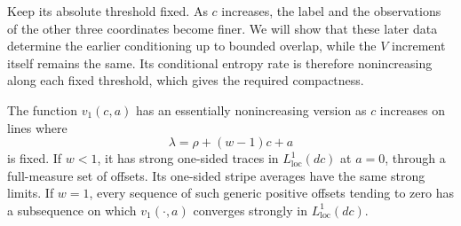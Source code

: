 Keep its absolute threshold fixed.  As $c$ increases, the label and
the observations of the other three coordinates become finer.  We will
show that these later data determine the earlier conditioning up to
bounded overlap, while the $V$ increment itself remains the same.  Its
conditional entropy rate is therefore nonincreasing along each fixed
threshold, which gives the required compactness.

\begin{lemma}
\label{lem:velocity-trace}
The function $v_1(c,a)$ has an essentially nonincreasing version as
$c$ increases on lines where
\[
 \lambda=\rho+(w-1)c+a
\]
is fixed.  If $w<1$, it has strong one-sided traces in
$L^1_{\mathrm{loc}}(dc)$ at $a=0$, through a full-measure set of
offsets.  Its one-sided stripe averages have the same strong limits.
If $w=1$, every sequence of such generic positive offsets tending to
zero has a subsequence on which $v_1(\cdot,a)$ converges strongly in
$L^1_{\mathrm{loc}}(dc)$.
\end{lemma}

